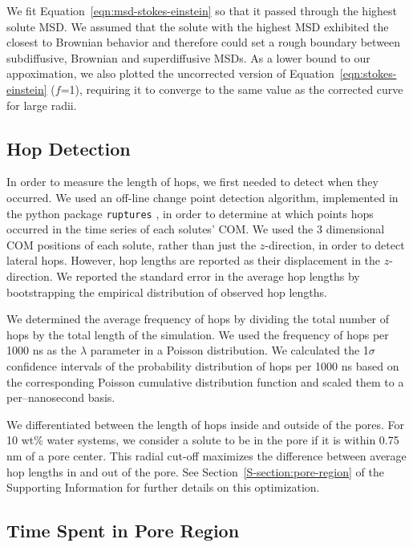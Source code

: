 \documentclass[journal=jpcbfk,manuscript=article]{achemso}
\begin{document}
  We fit Equation~\ref{eqn:msd-stokes-einstein} so that it passed through the
  highest solute MSD. We assumed that the solute with the highest MSD exhibited
  the closest to Brownian behavior and therefore could set a rough boundary
  between subdiffusive, Brownian and superdiffusive MSDs. As a lower bound to our
  appoximation, we also plotted the uncorrected version of
  Equation~\ref{eqn:stokes-einstein} ($f$=1), requiring it to converge to the
  same value as the corrected curve for large radii. 

  \subsection{Hop Detection}\label{method:hop_detection}
  
  In order to measure the length of hops, we first needed to detect
  when they occurred. We used an off-line change point detection 
  algorithm, implemented in the python package \texttt{ruptures}
  \cite{truong_ruptures:_2018}, in order to determine at which 
  points hops occurred in the time series of each solutes' COM. We
  used the 3 dimensional COM positions of each solute, rather than
  just the $z$-direction, in order to detect lateral hops. However,
  hop lengths are reported as their displacement in the $z$-direction.
  We reported the standard error in the average hop lengths by 
  bootstrapping the empirical distribution of observed
  hop lengths.\cite{efron_introduction_1994}

  We determined the average frequency of hops by dividing the total number of 
  hops by the total length of the simulation. We used the frequency of
  hops per 1000 ns as the $\lambda$ parameter in a Poisson distribution.
  We calculated the 1$\sigma$ confidence intervals of the probability %
  distribution of hops per 1000 ns based on the corresponding Poisson 
  cumulative distribution function and scaled them to a per--nanosecond basis. 
  
  We differentiated between the length of hops inside and outside of the 
  pores. For 10 wt\% water systems, we consider a solute to be in the pore
  if it is within 0.75 nm of a pore center. This radial cut-off maximizes 
  the difference between average hop lengths in and out of the pore. 
  See Section~\ref{S-section:pore-region} of the Supporting
  Information for further details on this optimization.
  
  \subsection{Time Spent in Pore Region}
  
\end{document}
